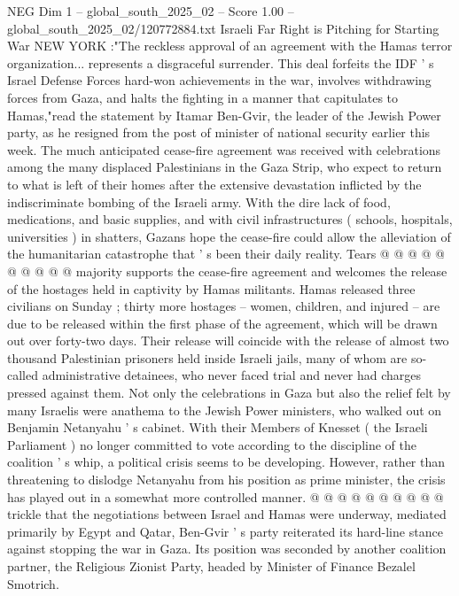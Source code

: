 \begin{textsample}{NEG Dim 1 – global\_south\_2025\_02 – Score 1.00 – global\_south\_2025\_02/120772884.txt}  \label{ex:f1_neg_089}
Israeli Far Right is Pitching for Starting War NEW YORK :"The reckless approval of an agreement with the Hamas terror organization... represents a disgraceful surrender.
This deal forfeits the IDF ' s Israel Defense Forces hard-won achievements in the war, involves withdrawing forces from Gaza, and halts the fighting in a manner that capitulates to Hamas,"read the statement by Itamar Ben-Gvir, the leader of the Jewish Power party, as he resigned from the post of minister of national security earlier this week.
The much anticipated cease-fire agreement was received with celebrations among the many displaced Palestinians in the Gaza Strip, who expect to return to what is left of their homes after the extensive devastation inflicted by the indiscriminate bombing of the Israeli army.
With the dire lack of food, medications, and basic supplies, and with civil infrastructures ( schools, hospitals, universities ) in shatters, Gazans hope the cease-fire could allow the alleviation of the humanitarian catastrophe that ' s been their daily reality.
Tears @ @ @ @ @ @ @ @ @ @ majority supports the cease-fire agreement and welcomes the release of the hostages held in captivity by Hamas militants.
Hamas released three civilians on Sunday ; thirty more hostages -- women, children, and injured -- are due to be released within the first phase of the agreement, which will be drawn out over forty-two days.
Their release will coincide with the release of almost two thousand Palestinian prisoners held inside Israeli jails, many of whom are so-called administrative detainees, who never faced trial and never had charges pressed against them.
Not only the celebrations in Gaza but also the relief felt by many Israelis were anathema to the Jewish Power ministers, who walked out on Benjamin Netanyahu ' s cabinet.
With their Members of Knesset ( the Israeli Parliament ) no longer committed to vote according to the discipline of the coalition ' s whip, a political crisis seems to be developing.
However, rather than threatening to dislodge Netanyahu from his position as prime minister, the crisis has played out in a somewhat more controlled manner. @ @ @ @ @ @ @ @ @ @ trickle that the negotiations between Israel and Hamas were underway, mediated primarily by Egypt and Qatar, Ben-Gvir ' s party reiterated its hard-line stance against stopping the war in Gaza.
Its position was seconded by another coalition partner, the Religious Zionist Party, headed by Minister of Finance Bezalel Smotrich.

\end{textsample}

